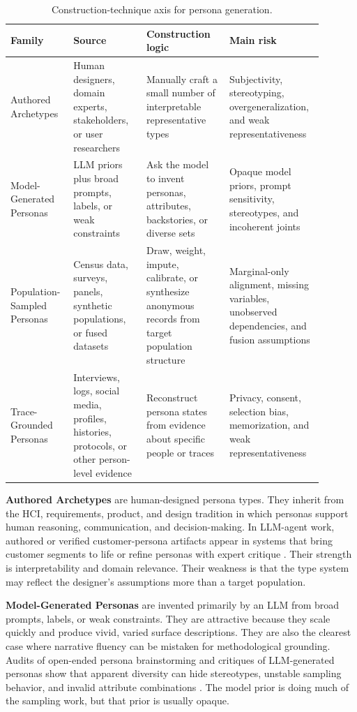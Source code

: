 \begin{table}[t]
\centering
\small
\begin{tabular}{p{0.18\linewidth}p{0.22\linewidth}p{0.25\linewidth}p{0.24\linewidth}}
\toprule
\textbf{Family} & \textbf{Source} & \textbf{Construction logic} & \textbf{Main risk} \\
\midrule
Authored Archetypes &
Human designers, domain experts, stakeholders, or user researchers &
Manually craft a small number of interpretable representative types &
Subjectivity, stereotyping, overgeneralization, and weak representativeness \\
\addlinespace
Model-Generated Personas &
LLM priors plus broad prompts, labels, or weak constraints &
Ask the model to invent personas, attributes, backstories, or diverse sets &
Opaque model priors, prompt sensitivity, stereotypes, and incoherent joints \\
\addlinespace
Population-Sampled Personas &
Census data, surveys, panels, synthetic populations, or fused datasets &
Draw, weight, impute, calibrate, or synthesize anonymous records from target population structure &
Marginal-only alignment, missing variables, unobserved dependencies, and fusion assumptions \\
\addlinespace
Trace-Grounded Personas &
Interviews, logs, social media, profiles, histories, protocols, or other person-level evidence &
Reconstruct persona states from evidence about specific people or traces &
Privacy, consent, selection bias, memorization, and weak representativeness \\
\bottomrule
\end{tabular}
\caption{Construction-technique axis for persona generation.}
\label{tab:construction-axis}
\end{table}

\textbf{Authored Archetypes} are human-designed persona types. They inherit from
the HCI, requirements, product, and design tradition in which personas support
human reasoning, communication, and decision-making. In LLM-agent work, authored
or verified customer-persona artifacts appear in systems that bring customer
segments to life or refine personas with expert critique
\citep{arxiv250517156,arxiv260609637}. Their strength is interpretability and
domain relevance. Their weakness is that the type system may reflect the
designer's assumptions more than a target population.

\textbf{Model-Generated Personas} are invented primarily by an LLM from broad
prompts, labels, or weak constraints. They are attractive because they scale
quickly and produce vivid, varied surface descriptions. They are also the
clearest case where narrative fluency can be mistaken for methodological
grounding. Audits of open-ended persona brainstorming and critiques of
LLM-generated personas show that apparent diversity can hide stereotypes,
unstable sampling behavior, and invalid attribute combinations
\citep{arxiv250316527,arxiv260200044}. The model prior is doing much of the
sampling work, but that prior is usually opaque.

